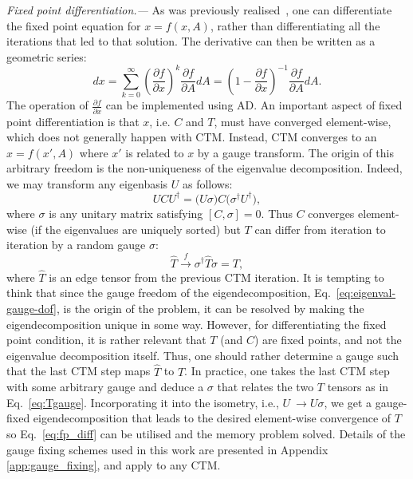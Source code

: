 \documentclass[twocolumn,floatfix,superscriptaddress,longbibliography,pra]{revtex4-2}
\renewcommand{\section}[1]{\emph{#1.---}}
\begin{document}
\section{Fixed point differentiation}%
As was previously realised~\cite{AD_CTM,ImplicitFunction}, one can differentiate the fixed point equation for $x = f(x,A)$, rather than differentiating all the iterations that led to that solution. The derivative can then be written as a geometric series:
\begin{equation}
    dx = \sum\limits_{k=0}^\infty \left(\frac{\partial f}{\partial x} \right)^k \frac{\partial f}{\partial A}dA = \left(1-\frac{\partial f}{\partial x} \right)^{-1} \frac{\partial f}{\partial A}dA.
    \label{eq:fp_diff}
\end{equation}
The operation of $\frac{\partial f}{\partial x}$ can be implemented using AD.
An important aspect of fixed point differentiation is that $x$, i.e. $C$ and $T$, must have converged element-wise, which does not generally happen with CTM. Instead, CTM converges to an $x=f(x',A)$ where $x'$ is related to $x$ by a gauge transform.
The origin of this arbitrary freedom is the non-uniqueness of the eigenvalue decomposition. Indeed, we may transform any eigenbasis $U$ as follows:
\begin{equation}
\label{eq:eigenval-gauge-dof}
UCU^\dagger = \big(U\sigma\big) C\big(\sigma^\dagger U^\dagger\big),
\end{equation}
where $\sigma$ is any unitary matrix satisfying $\left[C,\sigma\right]=0$. Thus $C$ converges element-wise (if the eigenvalues are uniquely sorted) but $T$ can differ from iteration to iteration by a random gauge $\sigma$:
\begin{equation}
\hat{T} \stackrel{f}{\to}
\sigma^\dagger \hat{T} \sigma=T,
\label{eq:Tgauge}
\end{equation}
where $\hat{T}$ is an edge tensor from the previous CTM iteration. It is tempting to think that since the gauge freedom of the eigendecomposition,
Eq.~\eqref{eq:eigenval-gauge-dof},
is the origin of the problem, it can be resolved by making the eigendecomposition unique in some way. However, for differentiating the fixed point condition, it is rather relevant that $T$ (and $C$) are fixed points, and not the eigenvalue decomposition itself. 
Thus, one should rather determine a gauge such that the last CTM step maps $\hat{T}$ to $T$. In practice, one takes the last CTM step with some arbitrary gauge and deduce a $\sigma$ that relates the two $T$ tensors as in Eq.~\eqref{eq:Tgauge}. Incorporating it into the isometry, i.e.,  $U~\rightarrow U\sigma$, we get a gauge-fixed eigendecomposition that leads to the desired element-wise convergence of $T$ so Eq.~\eqref{eq:fp_diff} can be utilised and the memory problem solved. 
Details of the gauge fixing schemes used in this work are presented in Appendix \ref{app:gauge_fixing}, and apply to any CTM. 
\end{document}
